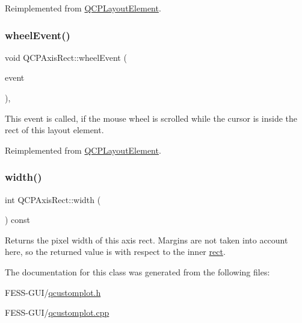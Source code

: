 Reimplemented from \hyperlink{class_q_c_p_layout_element_a929c2ec62e0e0e1d8418eaa802e2af9b}{Q\+C\+P\+Layout\+Element}.

\hypertarget{class_q_c_p_axis_rect_a5acf41fc30aa68ea263246ecfad85c31}{}\label{class_q_c_p_axis_rect_a5acf41fc30aa68ea263246ecfad85c31} 
\subsubsection{\texorpdfstring{wheel\+Event()}{wheelEvent()}}
{\footnotesize\ttfamily void Q\+C\+P\+Axis\+Rect\+::wheel\+Event (\begin{DoxyParamCaption}\item[{Q\+Wheel\+Event $\ast$}]{event }\end{DoxyParamCaption})\hspace{0.3cm}{\ttfamily [protected]}, {\ttfamily [virtual]}}

This event is called, if the mouse wheel is scrolled while the cursor is inside the rect of this layout element. 

Reimplemented from \hyperlink{class_q_c_p_layout_element_a300521d2fd18a893c1b85f6be11ce2bf}{Q\+C\+P\+Layout\+Element}.

\hypertarget{class_q_c_p_axis_rect_a204645398a4f9d0b0189385c7c2cfb91}{}\label{class_q_c_p_axis_rect_a204645398a4f9d0b0189385c7c2cfb91} 
\subsubsection{\texorpdfstring{width()}{width()}}
{\footnotesize\ttfamily int Q\+C\+P\+Axis\+Rect\+::width (\begin{DoxyParamCaption}{ }\end{DoxyParamCaption}) const\hspace{0.3cm}{\ttfamily [inline]}}

Returns the pixel width of this axis rect. Margins are not taken into account here, so the returned value is with respect to the inner \hyperlink{class_q_c_p_layout_element_a208effccfe2cca4a0eaf9393e60f2dd4}{rect}. 

The documentation for this class was generated from the following files\+:\begin{DoxyCompactItemize}
\item 
F\+E\+S\+S-\/\+G\+U\+I/\hyperlink{qcustomplot_8h}{qcustomplot.\+h}\item 
F\+E\+S\+S-\/\+G\+U\+I/\hyperlink{qcustomplot_8cpp}{qcustomplot.\+cpp}\end{DoxyCompactItemize}
